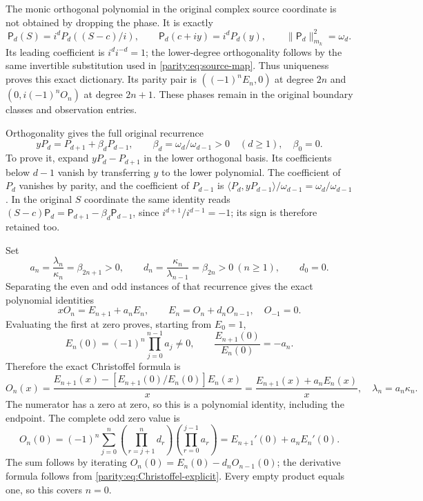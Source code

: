 The monic orthogonal polynomial in the original complex source
coordinate is not obtained by dropping the phase. It is exactly
\begin{equation}\label{parity:eq:S-polynomial-phase}
 \mathsf P_d(S)=i^dP_d((S-c)/i),\qquad
 \mathsf P_d(c+iy)=i^dP_d(y),\qquad
 \|\mathsf P_d\|_{m_k}^2=\omega_d.
\end{equation}
Its leading coefficient is $i^di^{-d}=1$; the lower-degree
orthogonality follows by the same invertible substitution used
in \eqref{parity:eq:source-map}. Thus uniqueness proves this exact
dictionary. Its parity pair is $((-1)^nE_n,0)$ at degree $2n$
and $(0,i(-1)^nO_n)$ at degree $2n+1$. These phases remain in
the original boundary classes and observation entries.

Orthogonality gives the full original recurrence
\[
 yP_d=P_{d+1}+\beta_dP_{d-1},\qquad
 \beta_d=\omega_d/\omega_{d-1}>0\quad(d\geq1),\quad \beta_0=0.
\]
To prove it, expand $yP_d-P_{d+1}$ in the lower orthogonal basis.
Its coefficients below $d-1$ vanish by transferring $y$ to the
lower polynomial. The coefficient of $P_d$ vanishes by parity,
and the coefficient of $P_{d-1}$ is
$\langle P_d,yP_{d-1}\rangle/\omega_{d-1}=\omega_d/\omega_{d-1}$.
In the original $S$ coordinate the same identity reads
$(S-c)\mathsf P_d=\mathsf P_{d+1}-\beta_d\mathsf P_{d-1}$,
since $i^{d+1}/i^{d-1}=-1$; its sign is therefore retained too.

Set
\begin{equation}\label{parity:eq:ad}
 a_n=\frac{\lambda_n}{\kappa_n}=\beta_{2n+1}>0,
 \qquad d_n=\frac{\kappa_n}{\lambda_{n-1}}=\beta_{2n}>0\ (n\geq1),
 \qquad d_0=0.
\end{equation}
Separating the even and odd instances of that recurrence gives
the exact polynomial identities
\begin{equation}\label{parity:eq:Christoffel}
 xO_n=E_{n+1}+a_nE_n,\qquad
 E_n=O_n+d_nO_{n-1},\quad O_{-1}=0.
\end{equation}
Evaluating the first at zero proves, starting from $E_0=1$,
\begin{equation}\label{parity:eq:E0}
 E_n(0)=(-1)^n\prod_{j=0}^{n-1}a_j\ne0,
 \qquad \frac{E_{n+1}(0)}{E_n(0)}=-a_n.
\end{equation}
Therefore the exact Christoffel formula is
\begin{equation}\label{parity:eq:Christoffel-explicit}
 O_n(x)=\frac{E_{n+1}(x)-[E_{n+1}(0)/E_n(0)]E_n(x)}x
        =\frac{E_{n+1}(x)+a_nE_n(x)}x,
 \quad \lambda_n=a_n\kappa_n.
\end{equation}
The numerator has a zero at zero, so this is a polynomial identity,
including the endpoint. The complete odd zero value is
\begin{equation}\label{parity:eq:O0}
 O_n(0)=(-1)^n\sum_{j=0}^n
     \left(\prod_{r=j+1}^nd_r\right)
     \left(\prod_{r=0}^{j-1}a_r\right)
 =E_{n+1}'(0)+a_nE_n'(0).
\end{equation}
The sum follows by iterating $O_n(0)=E_n(0)-d_nO_{n-1}(0)$;
the derivative formula follows from \eqref{parity:eq:Christoffel-explicit}.
Every empty product equals one, so this covers $n=0$.


